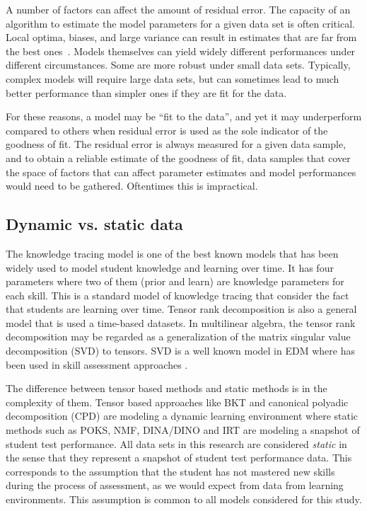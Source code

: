 A number of factors can affect the amount of residual error.  The capacity of an algorithm to estimate the model parameters for a given data set is often critical.  Local optima, biases, and large variance can result in estimates that are far from the best ones~\cite{hastie2005elements}.  Models themselves can yield widely different performances under different circumstances.  Some are more robust under small data sets.  Typically, complex models will require large data sets, but can sometimes lead to much better performance than simpler ones if they are fit for the data.

For these reasons, a model may be ``fit to the data'', and yet it may underperform compared to others when residual error is used as the sole indicator of the goodness of fit.  The residual error is always measured for a given data sample, and to obtain a reliable estimate of the goodness of fit, data samples that cover the space of factors that can affect parameter estimates and model performances would need to be gathered.  Oftentimes this is impractical.


\subsection{Dynamic vs. static data}

The knowledge tracing model \citep{corbett1994knowledge} is one of the best known models that has been widely used to model student knowledge and learning over time. It has four parameters where two of them (prior and learn) are knowledge parameters for each skill. This is a standard model of knowledge tracing that consider the fact that students are learning over time. Tensor rank decomposition is also a general model that is used a time-based datasets. In multilinear algebra, the tensor rank decomposition may be regarded as a generalization of the matrix singular value decomposition (SVD) to tensors. SVD is a well known model in EDM where has been used in skill assessment approaches \citep{Beheshti2012Numbers}.

The difference between tensor based methods and static methods is in the complexity of them. Tensor based approaches like BKT and canonical polyadic decomposition (CPD) are modeling a dynamic learning environment where static methods such as POKS, NMF, DINA/DINO and IRT are modeling a snapshot of student test performance. All data sets in this research are considered \textit{static} in the sense that they represent a snapshot of student test performance data.  This corresponds to the assumption that the student has not mastered new skills during the process of assessment, as we would expect from data from learning environments.  This assumption is common to all models considered for this study.


